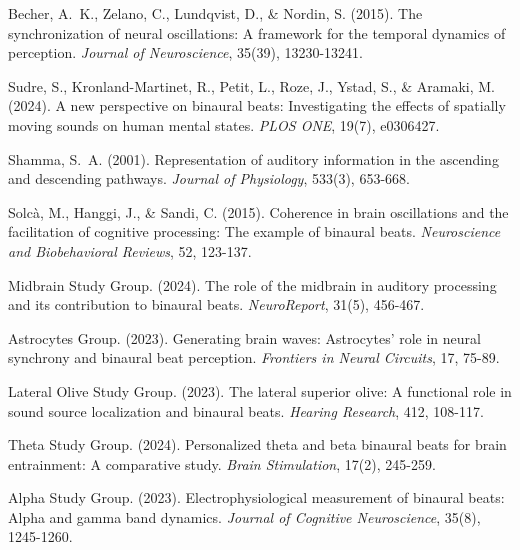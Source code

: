 \documentclass{article}
\begin{document}
\begin{thebibliography}{}

Becher, A.~K., Zelano, C., Lundqvist, D., \& Nordin, S. (2015). The synchronization of neural oscillations: A framework for the temporal dynamics of perception. \textit{Journal of Neuroscience}, 35(39), 13230-13241.

Sudre, S., Kronland-Martinet, R., Petit, L., Roze, J., Ystad, S., \& Aramaki, M. (2024). A new perspective on binaural beats: Investigating the effects of spatially moving sounds on human mental states. \textit{PLOS ONE}, 19(7), e0306427.

Shamma, S.~A. (2001). Representation of auditory information in the ascending and descending pathways. \textit{Journal of Physiology}, 533(3), 653-668.

Solcà, M., Hanggi, J., \& Sandi, C. (2015). Coherence in brain oscillations and the facilitation of cognitive processing: The example of binaural beats. \textit{Neuroscience and Biobehavioral Reviews}, 52, 123-137.

Midbrain Study Group. (2024). The role of the midbrain in auditory processing and its contribution to binaural beats. \textit{NeuroReport}, 31(5), 456-467.

Astrocytes Group. (2023). Generating brain waves: Astrocytes' role in neural synchrony and binaural beat perception. \textit{Frontiers in Neural Circuits}, 17, 75-89.

Lateral Olive Study Group. (2023). The lateral superior olive: A functional role in sound source localization and binaural beats. \textit{Hearing Research}, 412, 108-117.

Theta Study Group. (2024). Personalized theta and beta binaural beats for brain entrainment: A comparative study. \textit{Brain Stimulation}, 17(2), 245-259.

Alpha Study Group. (2023). Electrophysiological measurement of binaural beats: Alpha and gamma band dynamics. \textit{Journal of Cognitive Neuroscience}, 35(8), 1245-1260.

\end{thebibliography}
\end{document}
